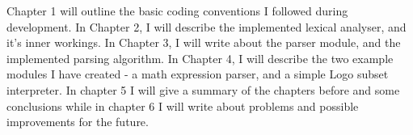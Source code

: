 Chapter 1 will outline the basic coding conventions I followed during development. In Chapter 2, I will describe the implemented lexical analyser, and it's inner workings. In Chapter 3, I will write about the parser module, and the implemented parsing algorithm. In Chapter 4, I will describe the two example modules I have created - a math expression parser, and a simple Logo subset interpreter. In chapter 5 I will give a summary of the chapters before and some conclusions while in chapter 6 I will write about problems and possible improvements for the future.
